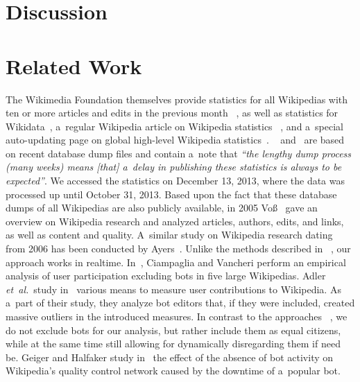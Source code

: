 \documentclass{sig-alternate}
\begin{document}
\section{Discussion}



\section{Related Work}

The Wikimedia Foundation themselves provide
statistics for all Wikipedias
with ten or more articles and edits in the previous month%
~\cite{zachte2013wikipedia},
as well as statistics for Wikidata~\cite{zachte2013wikidata},
a~regular Wikipedia article on Wikipedia statistics%
~\cite{wikipedia2013stats},
and a~special auto-updating page on global high-level
Wikipedia statistics~\cite{wikipedia2013special}.
~\cite{zachte2013wikidata} and~\cite{zachte2013wikipedia}
are based on recent database dump files
and contain a~note that \textit{``the lengthy dump process
(many weeks) means [that] a~delay in publishing these statistics
is always to be expected''}.
We accessed the statistics on December 13, 2013,
where the data was processed up until October 31, 2013.
Based upon the fact that these database dumps
of all Wikipedias are also publicly available,
in 2005 Voß~\cite{voss2005measuring} gave 
an overview on Wikipedia research
and analyzed articles, authors, edits, and links,
as well as content and quality.
A~similar study on Wikipedia research dating from 2006
has been conducted by Ayers~\cite{ayers2006researchingwikipedia}.
Unlike the methods described in~%
\cite{ayers2006researchingwikipedia,voss2005measuring,zachte2013wikidata,zachte2013wikipedia},
our approach works in realtime.
In~\cite{ciampaglia2010empiricalanalysis}, Ciampaglia and Vancheri
perform an empirical analysis of user participation
excluding bots in five large Wikipedias.
Adler \emph{et~al.}\ study in~\cite{adler2008measuringauthor}
various means to measure user contributions to Wikipedia.
As a~part of their study, they analyze bot editors
that, if they were included, created massive outliers
in the introduced measures.
In contrast to the approaches%
~\cite{adler2008measuringauthor,ciampaglia2010empiricalanalysis},
we do not exclude bots for our analysis,
but rather include them as equal citizens,
while at the same time still allowing for dynamically
disregarding them if need be.
Geiger and Halfaker study in~\cite{geiger2013withoutbots}
the effect of the absence of bot activity on Wikipedia's
quality control network caused by the downtime of a~popular bot.
\end{document}
